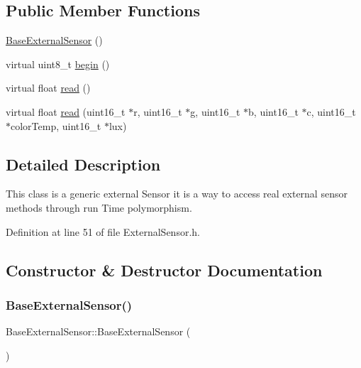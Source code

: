 \subsection*{Public Member Functions}
\begin{DoxyCompactItemize}
\item 
\hyperlink{class_base_external_sensor_a978d96a6563b646efb358c2790a9fc6f}{Base\+External\+Sensor} ()
\item 
virtual uint8\+\_\+t \hyperlink{class_base_external_sensor_a87d132803d4f4fdd4e66332809f0c9a0}{begin} ()
\item 
virtual float \hyperlink{class_base_external_sensor_a1564f16deacf57b51b9948ac29db4291}{read} ()
\item 
virtual float \hyperlink{class_base_external_sensor_ab1f906fc55c0cc2c55a38a85167199ee}{read} (uint16\+\_\+t $\ast$r, uint16\+\_\+t $\ast$g, uint16\+\_\+t $\ast$b, uint16\+\_\+t $\ast$c, uint16\+\_\+t $\ast$color\+Temp, uint16\+\_\+t $\ast$lux)
\end{DoxyCompactItemize}


\subsection{Detailed Description}
This class is a generic external Sensor it is a way to access real external sensor methods through run Time polymorphism. 

Definition at line 51 of file External\+Sensor.\+h.



\subsection{Constructor \& Destructor Documentation}
\mbox{\label{class_base_external_sensor_a978d96a6563b646efb358c2790a9fc6f}} 
\subsubsection{\texorpdfstring{Base\+External\+Sensor()}{BaseExternalSensor()}}
{\footnotesize\ttfamily Base\+External\+Sensor\+::\+Base\+External\+Sensor (\begin{DoxyParamCaption}{ }\end{DoxyParamCaption})\hspace{0.3cm}{\ttfamily [inline]}}

